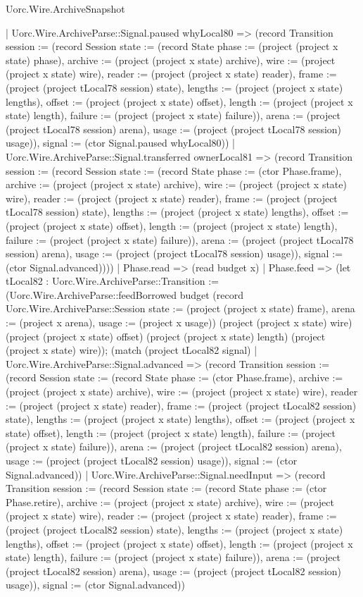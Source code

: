 \begin{lexlean}{Uorc.Wire.ArchiveSnapshot}
\begin{semanticmodule}
{        | Uorc.Wire.ArchiveParse::Signal.paused whyLocal80 => (record Transition {session := (record Session {state := (record State {phase := (project (project x state) phase), archive := (project (project x state) archive), wire := (project (project x state) wire), reader := (project (project x state) reader), frame := (project (project tLocal78 session) state), lengths := (project (project x state) lengths), offset := (project (project x state) offset), length := (project (project x state) length), failure := (project (project x state) failure)}), arena := (project (project tLocal78 session) arena), usage := (project (project tLocal78 session) usage)}), signal := (ctor Signal.paused whyLocal80)})
        | Uorc.Wire.ArchiveParse::Signal.transferred ownerLocal81 => (record Transition {session := (record Session {state := (record State {phase := (ctor Phase.frame), archive := (project (project x state) archive), wire := (project (project x state) wire), reader := (project (project x state) reader), frame := (project (project tLocal78 session) state), lengths := (project (project x state) lengths), offset := (project (project x state) offset), length := (project (project x state) length), failure := (project (project x state) failure)}), arena := (project (project tLocal78 session) arena), usage := (project (project tLocal78 session) usage)}), signal := (ctor Signal.advanced)})))
      | Phase.read => (read budget x)
      | Phase.feed => (let tLocal82 : Uorc.Wire.ArchiveParse::Transition := (Uorc.Wire.ArchiveParse::feedBorrowed budget (record Uorc.Wire.ArchiveParse::Session {state := (project (project x state) frame), arena := (project x arena), usage := (project x usage)}) (project (project x state) wire) (project (project x state) offset) (project (project x state) length) (project (project x state) wire)); (match (project tLocal82 signal)
        | Uorc.Wire.ArchiveParse::Signal.advanced => (record Transition {session := (record Session {state := (record State {phase := (ctor Phase.frame), archive := (project (project x state) archive), wire := (project (project x state) wire), reader := (project (project x state) reader), frame := (project (project tLocal82 session) state), lengths := (project (project x state) lengths), offset := (project (project x state) offset), length := (project (project x state) length), failure := (project (project x state) failure)}), arena := (project (project tLocal82 session) arena), usage := (project (project tLocal82 session) usage)}), signal := (ctor Signal.advanced)})
        | Uorc.Wire.ArchiveParse::Signal.needInput => (record Transition {session := (record Session {state := (record State {phase := (ctor Phase.retire), archive := (project (project x state) archive), wire := (project (project x state) wire), reader := (project (project x state) reader), frame := (project (project tLocal82 session) state), lengths := (project (project x state) lengths), offset := (project (project x state) offset), length := (project (project x state) length), failure := (project (project x state) failure)}), arena := (project (project tLocal82 session) arena), usage := (project (project tLocal82 session) usage)}), signal := (ctor Signal.advanced)})
}
\end{semanticmodule}
\end{lexlean}
